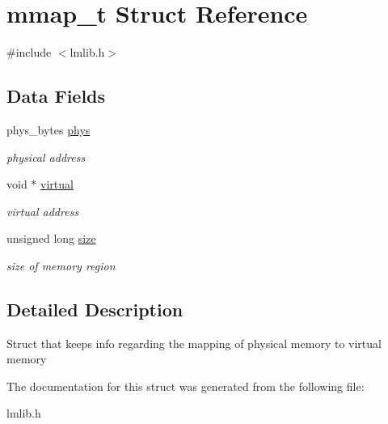 \hypertarget{structmmap__t}{}\section{mmap\+\_\+t Struct Reference}
\label{structmmap__t}


{\ttfamily \#include $<$lmlib.\+h$>$}

\subsection*{Data Fields}
\begin{DoxyCompactItemize}
\item 
phys\+\_\+bytes \hyperlink{group__lmlib_gab7a85fe0db943529016cf606e3a7167f}{phys}
\begin{DoxyCompactList}\small\item\em physical address \end{DoxyCompactList}\item 
void $\ast$ \hyperlink{group__lmlib_ga6a0ea2231d30f2b025e0c4b9f12dd6db}{virtual}
\begin{DoxyCompactList}\small\item\em virtual address \end{DoxyCompactList}\item 
unsigned long \hyperlink{group__lmlib_ga1e1268d164c38e4f8a4f4eb9058b0601}{size}
\begin{DoxyCompactList}\small\item\em size of memory region \end{DoxyCompactList}\end{DoxyCompactItemize}


\subsection{Detailed Description}
Struct that keeps info regarding the mapping of physical memory to virtual memory 

The documentation for this struct was generated from the following file\+:\begin{DoxyCompactItemize}
\item 
lmlib.\+h\end{DoxyCompactItemize}
